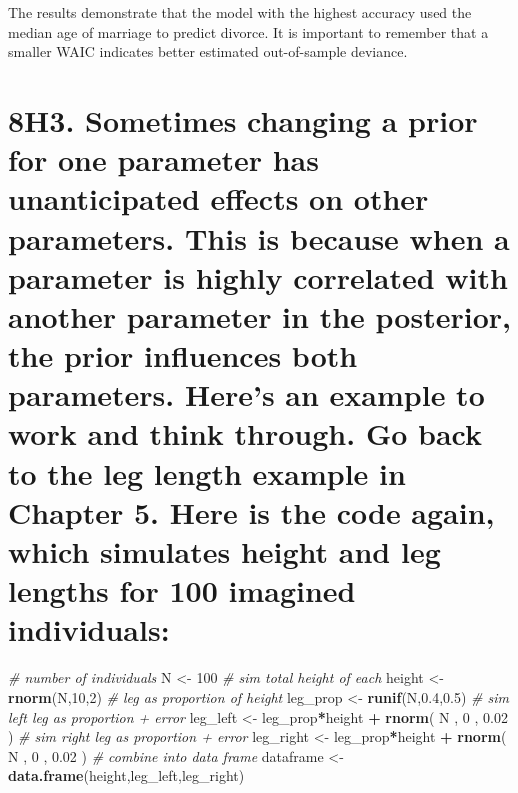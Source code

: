 \documentclass[]{article}
\newenvironment{Shaded}{\begin{snugshade}}{\end{snugshade}}
\newcommand{\KeywordTok}[1]{\textcolor[rgb]{0.13,0.29,0.53}{\textbf{#1}}}
\newcommand{\DecValTok}[1]{\textcolor[rgb]{0.00,0.00,0.81}{#1}}
\newcommand{\FloatTok}[1]{\textcolor[rgb]{0.00,0.00,0.81}{#1}}
\newcommand{\StringTok}[1]{\textcolor[rgb]{0.31,0.60,0.02}{#1}}
\newcommand{\CommentTok}[1]{\textcolor[rgb]{0.56,0.35,0.01}{\textit{#1}}}
\newcommand{\OperatorTok}[1]{\textcolor[rgb]{0.81,0.36,0.00}{\textbf{#1}}}
\newcommand{\NormalTok}[1]{#1}
\begin{document}
The results demonstrate that the model with the highest accuracy used
the median age of marriage to predict divorce. It is important to
remember that a smaller WAIC indicates better estimated out-of-sample
deviance.

\section{8H3. Sometimes changing a prior for one parameter has
unanticipated effects on other parameters. This is because when a
parameter is highly correlated with another parameter in the posterior,
the prior influences both parameters. Here's an example to work and
think through. Go back to the leg length example in Chapter 5. Here is
the code again, which simulates height and leg lengths for 100 imagined
individuals:}\label{h3.-sometimes-changing-a-prior-for-one-parameter-has-unanticipated-effects-on-other-parameters.-this-is-because-when-a-parameter-is-highly-correlated-with-another-parameter-in-the-posterior-the-prior-influences-both-parameters.-heres-an-example-to-work-and-think-through.-go-back-to-the-leg-length-example-in-chapter-5.-here-is-the-code-again-which-simulates-height-and-leg-lengths-for-100-imagined-individuals}

\begin{Shaded}
\begin{Highlighting}[]
\CommentTok{# number of individuals}
\NormalTok{N <-}\StringTok{ }\DecValTok{100} 
\CommentTok{# sim total height of each}
\NormalTok{height <-}\StringTok{ }\KeywordTok{rnorm}\NormalTok{(N,}\DecValTok{10}\NormalTok{,}\DecValTok{2}\NormalTok{) }
\CommentTok{# leg as proportion of height}
\NormalTok{leg_prop <-}\StringTok{ }\KeywordTok{runif}\NormalTok{(N,}\FloatTok{0.4}\NormalTok{,}\FloatTok{0.5}\NormalTok{)}
\CommentTok{# sim left leg as proportion + error}
\NormalTok{leg_left <-}\StringTok{ }\NormalTok{leg_prop}\OperatorTok{*}\NormalTok{height }\OperatorTok{+}
\StringTok{    }\KeywordTok{rnorm}\NormalTok{( N , }\DecValTok{0}\NormalTok{ , }\FloatTok{0.02}\NormalTok{ ) }
\CommentTok{# sim right leg as proportion + error}
\NormalTok{leg_right <-}\StringTok{ }\NormalTok{leg_prop}\OperatorTok{*}\NormalTok{height }\OperatorTok{+}
\StringTok{    }\KeywordTok{rnorm}\NormalTok{( N , }\DecValTok{0}\NormalTok{ , }\FloatTok{0.02}\NormalTok{ ) }
\CommentTok{# combine into data frame}
\NormalTok{dataframe <-}\StringTok{ }\KeywordTok{data.frame}\NormalTok{(height,leg_left,leg_right)}
\end{Highlighting}
\end{Shaded}
\end{document}
